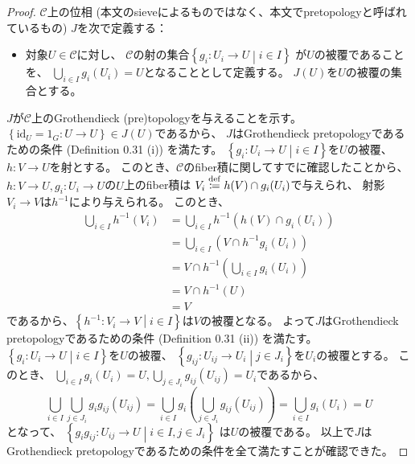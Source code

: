 \documentclass[uplatex]{jsarticle}
\theoremstyle{definition}
\def\id{\mathrm{id}}
\def\mcC{\mathcal{C}}
\newcommand{\dfn}{\overset{\mathrm{\tiny def}}{\coloneqq}}
\begin{document}
\begin{proof}
  \(\mcC\)上の位相 (本文のsieveによるものではなく、本文でpretopologyと呼ばれているもの)
  \(J\)を次で定義する：
  \begin{itemize}
    \item
    対象\(U\in \mcC\)に対し、
    \(\mcC\)の射の集合\(\left\{ g_i:U_i\to U\middle| i\in I\right\}\)
    が\(U\)の被覆であることを、
    \(\bigcup_{i\in I}g_i(U_i) = U\)となることとして定義する。
    \(J(U)\)を\(U\)の被覆の集合とする。
  \end{itemize}
  \(J\)が\(\mcC\)上のGrothendieck (pre)topologyを与えることを示す。
  \(\left\{ \id_U = 1_G : U\to U\right\} \in J(U)\)であるから、
  \(J\)はGrothendieck pretopologyであるための条件 (Definition 0.31 (i)) を満たす。
  \(\left\{ g_i:U_i\to U\middle| i\in I\right\}\)を\(U\)の被覆、
  \(h:V\to U\)を射とする。
  このとき、\(\mcC\)のfiber積に関してすでに確認したことから、
  \(h:V\to U, g_i:U_i\to U\)の\(U\)上のfiber積は
  \(V_i\dfn h(V) \cap g_i(U_i)\)で与えられ、
  射影\(V_i\to V\)は\(h^{-1}\)により与えられる。
  このとき、
  \begin{align*}
    \bigcup_{i\in I} h^{-1}\left(V_i\right)
    &= \bigcup_{i\in I} h^{-1}\left( h(V) \cap g_i(U_i) \right) \\
    &= \bigcup_{i\in I} \left( V \cap h^{-1}g_i(U_i) \right) \\
    &= V \cap h^{-1}\left( \bigcup_{i\in I} g_i(U_i) \right) \\
    &= V \cap h^{-1}(U) \\
    &= V
  \end{align*}
  であるから、\(\left\{h^{-1}:V_i\to V\middle| i\in I\right\}\)は\(V\)の被覆となる。
  よって\(J\)はGrothendieck pretopologyであるための条件 (Definition 0.31 (ii)) を満たす。
  \(\left\{ g_i:U_i\to U\middle| i\in I\right\}\)を\(U\)の被覆、
  \(\left\{ g_{ij}:U_{ij}\to U_i\middle| j\in J_i\right\}\)を\(U_i\)の被覆とする。
  このとき、
  \(\bigcup_{i\in I}g_i(U_i) = U ,
  \bigcup_{j\in J_i}g_{ij}(U_{ij}) = U_i\)であるから、
  \[
  \bigcup_{i\in I}\bigcup_{j\in J_i}g_ig_{ij}(U_{ij})
  = \bigcup_{i\in I} g_i\left(\bigcup_{j\in J_i}g_{ij}(U_{ij})\right)
  = \bigcup_{i\in I} g_i(U_i)
  = U
  \]
  となって、
  \(\left\{ g_ig_{ij}:U_{ij}\to U \middle| i\in I, j\in J_i\right\}\)
  は\(U\)の被覆である。
  以上で\(J\)はGrothendieck pretopologyであるための条件を全て満たすことが確認できた。


\end{proof}
\end{document}
